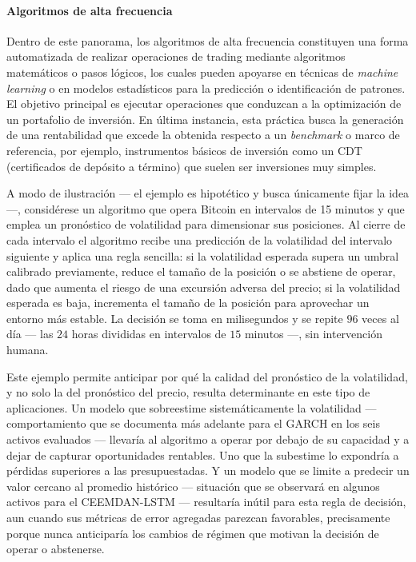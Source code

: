 \documentclass[12pt]{paper}
\begin{document}
\paragraph{Algoritmos de alta frecuencia}
Dentro de este panorama, los algoritmos de alta frecuencia constituyen una forma automatizada de realizar operaciones de trading mediante algoritmos matemáticos o pasos lógicos, los cuales pueden apoyarse en técnicas de \textit{machine learning} o en modelos estadísticos para la predicción o identificación de patrones. El objetivo principal es ejecutar operaciones que conduzcan a la optimización de un portafolio de inversión. En última instancia, esta práctica busca la generación de una rentabilidad que excede la obtenida respecto a un \textit{benchmark} \cite{jansen2020machine} o marco de referencia, por ejemplo, instrumentos básicos de inversión como un CDT (certificados de depósito a término) que suelen ser inversiones muy simples.

A modo de ilustración --- el ejemplo es hipotético y busca únicamente fijar la idea ---, considérese un algoritmo que opera Bitcoin en intervalos de 15 minutos y que emplea un pronóstico de volatilidad para dimensionar sus posiciones. Al cierre de cada intervalo el algoritmo recibe una predicción de la volatilidad del intervalo siguiente y aplica una regla sencilla: si la volatilidad esperada supera un umbral calibrado previamente, reduce el tamaño de la posición o se abstiene de operar, dado que aumenta el riesgo de una excursión adversa del precio; si la volatilidad esperada es baja, incrementa el tamaño de la posición para aprovechar un entorno más estable. La decisión se toma en milisegundos y se repite $96$ veces al día --- las $24$ horas divididas en intervalos de $15$ minutos ---, sin intervención humana.

Este ejemplo permite anticipar por qué la calidad del pronóstico de la volatilidad, y no solo la del pronóstico del precio, resulta determinante en este tipo de aplicaciones. Un modelo que sobreestime sistemáticamente la volatilidad --- comportamiento que se documenta más adelante para el GARCH en los seis activos evaluados --- llevaría al algoritmo a operar por debajo de su capacidad y a dejar de capturar oportunidades rentables. Uno que la subestime lo expondría a pérdidas superiores a las presupuestadas. Y un modelo que se limite a predecir un valor cercano al promedio histórico --- situación que se observará en algunos activos para el CEEMDAN-LSTM --- resultaría inútil para esta regla de decisión, aun cuando sus métricas de error agregadas parezcan favorables, precisamente porque nunca anticiparía los cambios de régimen que motivan la decisión de operar o abstenerse.
\end{document}
